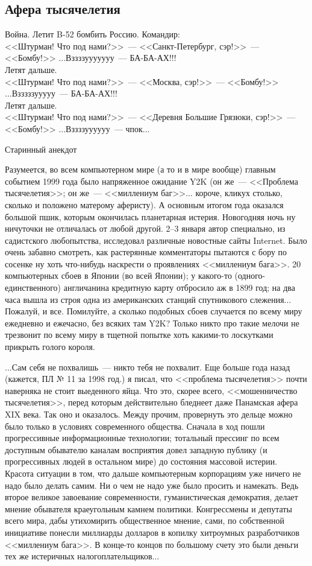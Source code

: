 \documentclass{scrbook}
\makeatletter
\newcommand{\defaultepigraphwidth}{0.5} %
\newcommand{\flqq}{<<}
\newcommand{\frqq}{>>}
\newcommand{\mdash}{~--- }
\newcommand{\ndash}{--}
\newcommand{\essaysection}[1]{\subsection*{#1}\nopagebreak}
\newcommand{\myepigraph}[3][\@empty]{
	\ifx\@empty#1
		\setlength{\epigraphwidth}{\defaultepigraphwidth\textwidth}
	\else
		\setlength{\epigraphwidth}{#1\textwidth}
	\fi
	\epigraph{#2}{#3}
	\setlength{\epigraphwidth}{\defaultepigraphwidth\textwidth} %
	\nopagebreak
}
\makeatother
\begin{document}
\essaysection{Афера тысячелетия}

\myepigraph{Война. Летит B-52 бомбить Россию. Командир: \\
{\flqq}Штурман! Что под нами?{\frqq}{\mdash}{\flqq}Санкт-Петербург, сэр!{\frqq}{\mdash}{\flqq}Бомбу!{\frqq} ...Вззззууууууу{\mdash}БА-БА-АХ!!! \\
Летят дальше. \\
{\flqq}Штурман! Что под нами?{\frqq}{\mdash}{\flqq}Москва, сэр!{\frqq}{\mdash}{\flqq}Бомбу!{\frqq} ...Взззззууууу{\mdash}БА-БА-АХ!!! \\
Летят дальше. \\
{\flqq}Штурман! Что под нами?{\frqq}{\mdash}{\flqq}Деревня Большие Грязюки, сэр!{\frqq}{\mdash}{\flqq}Бомбу!{\frqq} ...Вззззуууууу{\mdash}чпок...}
{Старинный анекдот}

Разумеется, во всем компьютерном мире (а то и в мире вообще) главным событием 1999 года было напряженное ожидание Y2K (он же{\mdash}{\flqq}Проблема тысячелетия{\frqq}; он же{\mdash}{\flqq}миллениум баг{\frqq}... короче, кликух столько, сколько и положено матерому аферисту). А основным итогом года оказался большой пшик, которым окончилась планетарная истерия. Новогодняя ночь ну ничуточки не отличалась от любой другой. 2{\ndash}3 января автор специально, из садистского любопытства, исследовал различные новостные сайты Internet. Было очень забавно смотреть, как растерянные комментаторы пытаются с бору по сосенке ну хоть что-нибудь наскрести о проявлениях {\flqq}миллениум бага{\frqq}. 20 компьютерных сбоев в Японии (во всей Японии); у какого-то (одного-единственного) англичанина кредитную карту отбросило аж в 1899 год; на два часа вышла из строя одна из американских станций спутникового слежения... Пожалуй, и все. Помилуйте, а сколько подобных сбоев случается по всему миру ежедневно и ежечасно, без всяких там Y2K? Только никто про такие мелочи не трезвонит по всему миру в тщетной попытке хоть какими-то лоскутками прикрыть голого короля.

...Сам себя не похвалишь{\mdash}никто тебя не похвалит. Еще больше года назад (кажется, ПЛ № 11 за 1998 год.) я писал, что {\flqq}проблема тысячелетия{\frqq} почти наверняка не стоит выеденного яйца. Что это, скорее всего, {\flqq}мошенничество тысячелетия{\frqq}, перед которым действительно бледнеет даже Панамская афера XIX века. Так оно и оказалось. Между прочим, провернуть это дельце можно было только в условиях современного общества. Сначала в ход пошли прогрессивные информационные технологии; тотальный прессинг по всем доступным обывателю каналам восприятия довел западную публику (и прогрессивных людей в остальном мире) до состояния массовой истерии. Красота ситуации в том, что дальше компьютерным корпорациям уже ничего не надо было делать самим. Ни о чем не надо уже было просить и намекать. Ведь второе великое завоевание современности, гуманистическая демократия, делает мнение обывателя краеугольным камнем политики. Конгрессмены и депутаты всего мира, дабы утихомирить общественное мнение, сами, по собственной инициативе понесли миллиарды долларов в копилку хитроумных разработчиков {\flqq}миллениум бага{\frqq}. В конце-то концов по большому счету это были деньги тех же истеричных налогоплательщиков...
\end{document}
